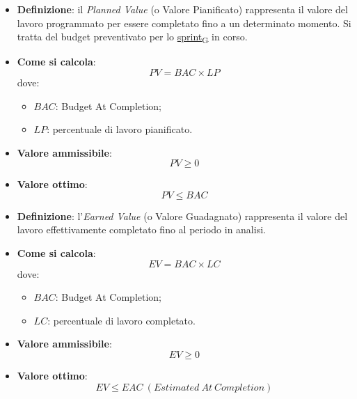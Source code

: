 \hypertarget{1M}{}
\begin{itemize}
	\item \textbf{Definizione}: il \textit{Planned Value} (o Valore Pianificato) rappresenta il valore del lavoro programmato per essere completato fino a un determinato momento. Si tratta del budget preventivato per lo \href{https://7last.github.io/docs/rtb/documentazione-interna/glossario\#sprint}{sprint\textsubscript{G}} in corso.
	\item \textbf{Come si calcola}: \begin{equation*}PV = BAC \times LP\end{equation*} dove:
		\begin{itemize}
			\item $BAC$: Budget At Completion;
			\item $LP$: percentuale di lavoro pianificato.
		\end{itemize}
	\item \textbf{Valore ammissibile}: \begin{equation*}PV \geq 0\end{equation*}
	\item \textbf{Valore ottimo}: \begin{equation*}PV \leq BAC\end{equation*}
\end{itemize}

\hypertarget{2M}{}
\begin{itemize}
	\item \textbf{Definizione}: l'\textit{Earned Value} (o Valore Guadagnato) rappresenta il valore del lavoro effettivamente completato fino al periodo in analisi.
	\item \textbf{Come si calcola}: \begin{equation*}EV = BAC \times LC\end{equation*} dove:
		\begin{itemize}
			\item $BAC$: Budget At Completion;
			\item $LC$: percentuale di lavoro completato.
		\end{itemize}
	\item \textbf{Valore ammissibile}: \begin{equation*}EV \geq 0\end{equation*}
	\item \textbf{Valore ottimo}: \begin{equation*}EV \leq EAC\ (Estimated\ At\ Completion)\end{equation*}
\end{itemize}

